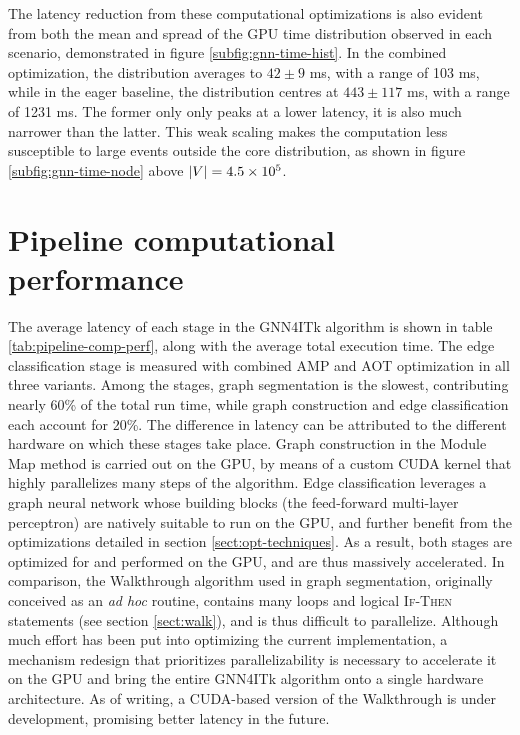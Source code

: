 The latency reduction from these computational optimizations is also evident from both the mean and spread of the GPU time distribution observed in each scenario, demonstrated in figure \ref{subfig:gnn-time-hist}.
In the combined optimization, the distribution averages to $42\pm 9$ ms, with a range of 103 ms, while in the eager baseline, the distribution centres at $443\pm117$ ms, with a range of 1231 ms. 
The former only only peaks at a lower latency, it is also much narrower than the latter.
This weak scaling makes the computation less susceptible to large events outside the core distribution, as shown in figure \ref{subfig:gnn-time-node} above $\abs{V}=4.5\times 10^5$.



\section{Pipeline computational performance}
\label{sect:pipeline-comp-perf}
The average latency of each stage in the GNN4ITk algorithm is shown in table \ref{tab:pipeline-comp-perf}, along with the average total execution time. 
The edge classification stage is measured with combined AMP and AOT optimization in all three variants.
Among the stages, graph segmentation is the slowest, contributing nearly 60\% of the total run time, while graph construction and edge classification each account for 20\%.
The difference in latency can be attributed to the different hardware on which these stages take place.
Graph construction in the Module Map method is carried out on the GPU, by means of a custom CUDA kernel that highly parallelizes many steps of the algorithm.
Edge classification leverages a graph neural network whose building blocks (the feed-forward multi-layer perceptron) are natively suitable to run on the GPU, and further benefit from the optimizations detailed in section \ref{sect:opt-techniques}.
As a result, both stages are optimized for and performed on the GPU, and are thus massively accelerated.
In comparison, the Walkthrough algorithm used in graph segmentation, originally conceived as an \textit{ad hoc} routine, contains many loops and logical \textsc{If-Then} statements (see section \ref{sect:walk}), and is thus difficult to parallelize.  
Although much effort has been put into optimizing the current implementation, a mechanism redesign that prioritizes parallelizability is necessary to accelerate it on the GPU and bring the entire GNN4ITk algorithm onto a single hardware architecture.
As of writing, a CUDA-based version of the Walkthrough is under development, promising better latency in the future. 

